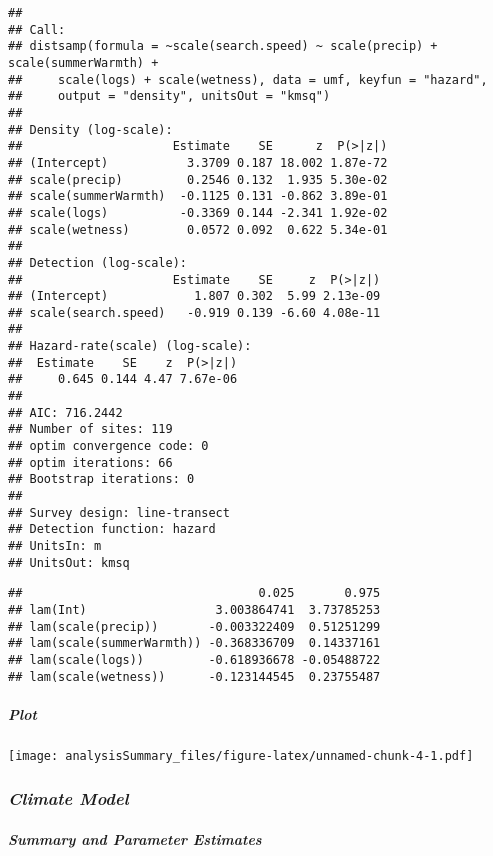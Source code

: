 \documentclass[
]{article}
\begin{document}
\begin{verbatim}
## 
## Call:
## distsamp(formula = ~scale(search.speed) ~ scale(precip) + scale(summerWarmth) + 
##     scale(logs) + scale(wetness), data = umf, keyfun = "hazard", 
##     output = "density", unitsOut = "kmsq")
## 
## Density (log-scale):
##                     Estimate    SE      z  P(>|z|)
## (Intercept)           3.3709 0.187 18.002 1.87e-72
## scale(precip)         0.2546 0.132  1.935 5.30e-02
## scale(summerWarmth)  -0.1125 0.131 -0.862 3.89e-01
## scale(logs)          -0.3369 0.144 -2.341 1.92e-02
## scale(wetness)        0.0572 0.092  0.622 5.34e-01
## 
## Detection (log-scale):
##                     Estimate    SE     z  P(>|z|)
## (Intercept)            1.807 0.302  5.99 2.13e-09
## scale(search.speed)   -0.919 0.139 -6.60 4.08e-11
## 
## Hazard-rate(scale) (log-scale):
##  Estimate    SE    z  P(>|z|)
##     0.645 0.144 4.47 7.67e-06
## 
## AIC: 716.2442 
## Number of sites: 119
## optim convergence code: 0
## optim iterations: 66 
## Bootstrap iterations: 0 
## 
## Survey design: line-transect
## Detection function: hazard
## UnitsIn: m
## UnitsOut: kmsq
\end{verbatim}

\begin{verbatim}
##                                 0.025       0.975
## lam(Int)                  3.003864741  3.73785253
## lam(scale(precip))       -0.003322409  0.51251299
## lam(scale(summerWarmth)) -0.368336709  0.14337161
## lam(scale(logs))         -0.618936678 -0.05488722
## lam(scale(wetness))      -0.123144545  0.23755487
\end{verbatim}

\hypertarget{plot}{%
\subparagraph{Plot}\label{plot}}

\texttt{[image: analysisSummary\_files/figure-latex/unnamed-chunk-4-1.pdf]}

\hypertarget{climate-model}{%
\subsubsection{\texorpdfstring{\emph{Climate
Model}}{Climate Model}}\label{climate-model}}

\hypertarget{summary-and-parameter-estimates-1}{%
\subparagraph{Summary and Parameter
Estimates}\label{summary-and-parameter-estimates-1}}
\end{document}
